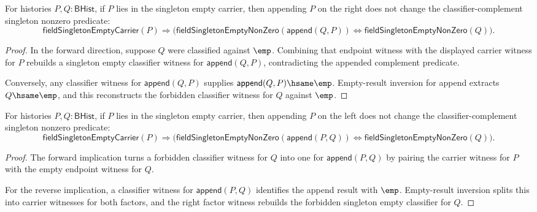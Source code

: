 \begin{theorem}
\label{thm:field-singleton-empty-nonzero-append-right-cancel}
For histories $P,Q:\mathsf{BHist}$, if $P$ lies in the singleton empty
carrier, then appending $P$ on the right does not change the
classifier-complement singleton nonzero predicate:
$$
\mathsf{fieldSingletonEmptyCarrier}(P)\Rightarrow
\bigl(
\mathsf{fieldSingletonEmptyNonZero}(\mathsf{append}(Q,P))
\Longleftrightarrow
\mathsf{fieldSingletonEmptyNonZero}(Q)
\bigr).
$$
\end{theorem}
\begin{proof}
In the forward direction, suppose $Q$ were classified against $\emp$. Combining
that endpoint witness with the displayed carrier witness for $P$ rebuilds a
singleton empty classifier witness for $\mathsf{append}(Q,P)$, contradicting
the appended complement predicate.

Conversely, any classifier witness for $\mathsf{append}(Q,P)$ supplies
$\mathsf{append}(Q,P)\hsame\emp$. Empty-result inversion for append extracts
$Q\hsame\emp$, and this reconstructs the forbidden classifier witness for
$Q$ against $\emp$.
\end{proof}

\begin{theorem}
\label{thm:field-singleton-empty-nonzero-append-left-cancel}
For histories $P,Q:\mathsf{BHist}$, if $P$ lies in the singleton empty
carrier, then appending $P$ on the left does not change the
classifier-complement singleton nonzero predicate:
$$
\mathsf{fieldSingletonEmptyCarrier}(P)\Rightarrow
\bigl(
\mathsf{fieldSingletonEmptyNonZero}(\mathsf{append}(P,Q))
\Longleftrightarrow
\mathsf{fieldSingletonEmptyNonZero}(Q)
\bigr).
$$
\end{theorem}
\begin{proof}
The forward implication turns a forbidden classifier witness for $Q$ into one
for $\mathsf{append}(P,Q)$ by pairing the carrier witness for $P$ with the
empty endpoint witness for $Q$.

For the reverse implication, a classifier witness for
$\mathsf{append}(P,Q)$ identifies the append result with $\emp$. Empty-result
inversion splits this into carrier witnesses for both factors, and the right
factor witness rebuilds the forbidden singleton empty classifier for $Q$.
\end{proof}

